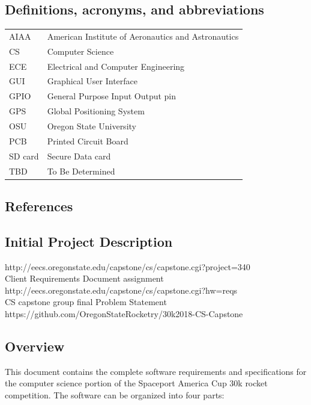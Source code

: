 \documentclass[onecolumn, draftclsnofoot, 10pt, compsoc]{IEEEtran}
\begin{document}
\subsection{Definitions, acronyms, and abbreviations}
\begin{center}
  \begin{tabular}{|l|l|}
      \hline
      AIAA	&American Institute of Aeronautics and Astronautics\\
      CS		&Computer Science\\
      \hline
      ECE		&Electrical and Computer Engineering\\
      GUI		&Graphical User Interface\\
      \hline
      GPIO	&General Purpose Input Output pin\\
      GPS		&Global Positioning System\\
      \hline
      OSU		&Oregon State University\\
      PCB		&Printed Circuit Board\\
      \hline
      SD card	&Secure Data card\\
      TBD		&To Be Determined\\
      \hline
  \end{tabular}
\end{center}

\subsection{References}
\subsection*{Initial Project Description}
http://eecs.oregonstate.edu/capstone/cs/capstone.cgi?project=340\\
Client Requirements Document assignment\\
http://eecs.oregonstate.edu/capstone/cs/capstone.cgi?hw=reqs\\
CS capstone group final Problem Statement\\
https://github.com/OregonStateRocketry/30k2018-CS-Capstone

\subsection{Overview}
This document contains the complete software requirements and specifications for the computer science portion of the Spaceport America Cup 30k rocket competition.  The software can be organized into four parts:
\end{document}
